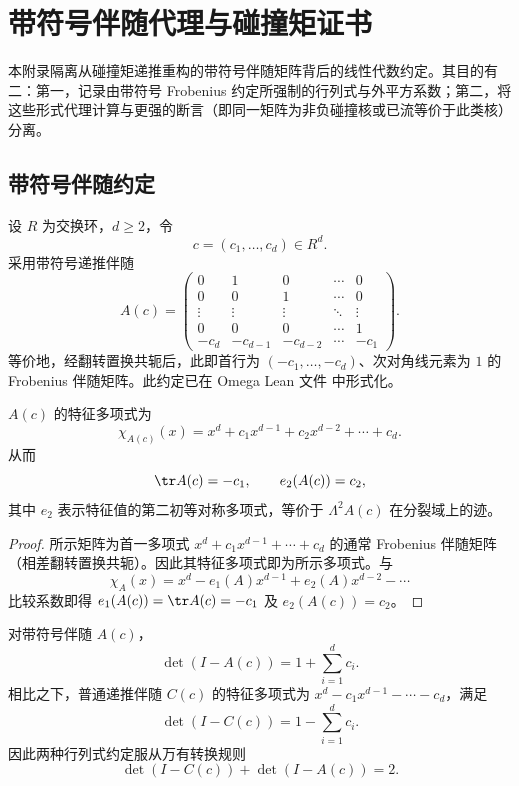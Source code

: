 \documentclass[../../main.tex]{subfiles}
\begin{document}
\section{带符号伴随代理与碰撞矩证书}\label{app:signed-companion-collision-audit}

本附录隔离从碰撞矩递推重构的带符号伴随矩阵背后的线性代数约定。其目的有二：第一，记录由带符号 Frobenius 约定所强制的行列式与外平方系数；第二，将这些形式代理计算与更强的断言（即同一矩阵为非负碰撞核或已流等价于此类核）分离。

\subsection{带符号伴随约定}

设 \(R\) 为交换环，\(d\geq 2\)，令
\[
    c=(c_1,\ldots,c_d)\in R^d.
\]
采用带符号递推伴随
\[
A(c)=
\begin{pmatrix}
0&1&0&\cdots&0\\
0&0&1&\cdots&0\\
\vdots&\vdots&\vdots&\ddots&\vdots\\
0&0&0&\cdots&1\\
-c_d&-c_{d-1}&-c_{d-2}&\cdots&-c_1
\end{pmatrix}.
\]
等价地，经翻转置换共轭后，此即首行为 \((-c_1,\ldots,-c_d)\)、次对角线元素为 \(1\) 的 Frobenius 伴随矩阵。此约定已在 Omega Lean 文件
\texttt{} 中形式化。

\begin{lemma}[带符号伴随系数]\label{lem:signed-companion-coefficients}
\(A(c)\) 的特征多项式为
\[
    \chi_{A(c)}(x)=x^d+c_1x^{d-1}+c_2x^{d-2}+\cdots+c_d.
\]
从而
\[
    \tr A(c)=-c_1,\qquad e_2(A(c))=c_2,
\]
其中 \(e_2\) 表示特征值的第二初等对称多项式，等价于 \(\Lambda^2 A(c)\) 在分裂域上的迹。
\end{lemma}

\begin{proof}
所示矩阵为首一多项式 \(x^d+c_1x^{d-1}+\cdots+c_d\) 的通常 Frobenius 伴随矩阵（相差翻转置换共轭）。因此其特征多项式即为所示多项式。与
\[
    \chi_A(x)=x^d-e_1(A)x^{d-1}+e_2(A)x^{d-2}-\cdots
\]
比较系数即得 \(e_1(A(c))=\tr A(c)=-c_1\) 及 \(e_2(A(c))=c_2\)。
\end{proof}

\begin{theorem}[带符号伴随行列式]\label{thm:signed-companion-det}
对带符号伴随 \(A(c)\)，
\[
    \det(I-A(c))=1+\sum_{i=1}^d c_i.
\]
相比之下，普通递推伴随 \(C(c)\) 的特征多项式为 \(x^d-c_1x^{d-1}-\cdots-c_d\)，满足
\[
    \det(I-C(c))=1-\sum_{i=1}^d c_i.
\]
因此两种行列式约定服从万有转换规则
\[
    \det(I-C(c))+\det(I-A(c))=2.
\]
\end{theorem}
\end{document}
